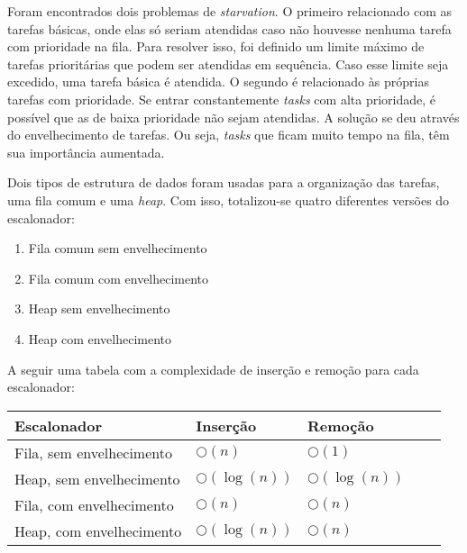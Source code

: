 \documentclass[a4paper,onecolumn, 10pt]{article}
\begin{document}
Foram encontrados dois problemas de \textit{starvation}. O primeiro relacionado com as tarefas básicas,
onde elas só seriam atendidas caso não houvesse nenhuma tarefa com prioridade na fila. Para resolver isso, foi definido um
limite máximo de tarefas prioritárias que podem ser atendidas em sequência. Caso esse limite seja excedido, uma tarefa
básica é atendida. O segundo é relacionado às próprias tarefas com prioridade. 
Se entrar constantemente \textit{tasks} com alta
prioridade, é possível que as de baixa prioridade não sejam atendidas. A solução se deu através do envelhecimento de
tarefas. Ou seja, \textit{tasks} que ficam muito tempo na fila, têm sua importância aumentada.

Dois tipos de estrutura de dados foram usadas para a organização das tarefas, uma fila comum e uma \textit{heap}. Com
isso, totalizou-se quatro diferentes versões do escalonador:
\begin{enumerate}
    \item Fila comum sem envelhecimento
    \item Fila comum com envelhecimento
    \item Heap sem envelhecimento
    \item Heap com envelhecimento
\end{enumerate}
A seguir uma tabela com a complexidade de inserção e remoção para cada escalonador:
\begin{center}
    \begin{tabular}{ | l | l | l | l | p{5cm} |}
    \hline
    Escalonador & Inserção & Remoção \\ \hline
    Fila, sem envelhecimento & $\bigcirc(n)$ & $\bigcirc(1)$ \\ \hline 
    Heap, sem envelhecimento & $\bigcirc(\log(n))$ & $\bigcirc(\log(n))$ \\ \hline
    Fila, com envelhecimento & $\bigcirc(n)$ & $\bigcirc(n)$ \\ \hline
    Heap, com envelhecimento & $\bigcirc(\log(n))$ & $\bigcirc(n)$ \\ \hline
    \end{tabular}
\end{center}

\end{document}

